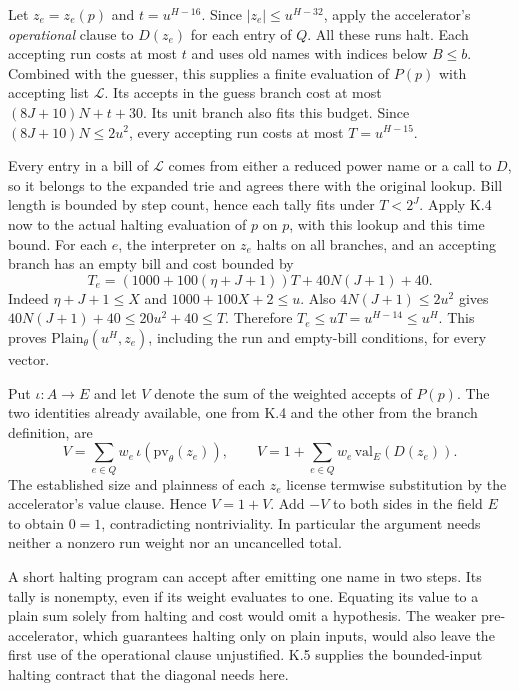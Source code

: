 \clearpage
{}
Let $z_e=z_e(p)$ and $t=u^{H-16}$. Since $|z_e|\le u^{H-32}$, apply the accelerator's \emph{operational} clause to $D(z_e)$ for each entry of $Q$. All these runs halt. Each accepting run costs at most $t$ and uses old names with indices below $B\le b$. Combined with the guesser, this supplies a finite evaluation of $P(p)$ with accepting list $\mathcal L$. Its accepts in the guess branch cost at most $(8J+10)N+t+30$. Its unit branch also fits this budget. Since $(8J+10)N\le2u^2$, every accepting run costs at most $T=u^{H-15}$.

Every entry in a bill of $\mathcal L$ comes from either a reduced power name or a call to $D$, so it belongs to the expanded trie and agrees there with the original lookup. Bill length is bounded by step count, hence each tally fits under $T<2^J$. Apply K.4 now to the actual halting evaluation of $p$ on $p$, with this lookup and this time bound. For each $e$, the interpreter on $z_e$ halts on all branches, and an accepting branch has an empty bill and cost bounded by
\[
 T_e=(1000+100(\eta+J+1))T+40N(J+1)+40.
\]
Indeed $\eta+J+1\le X$ and $1000+100X+2\le u$. Also $4N(J+1)\le2u^2$ gives $40N(J+1)+40\le20u^2+40\le T$. Therefore $T_e\le uT=u^{H-14}\le u^H$. This proves $\mathrm{Plain}_\theta(u^H,z_e)$, including the run and empty-bill conditions, for every vector.

Put $\iota:A\to E$ and let $V$ denote the sum of the weighted accepts of $P(p)$. The two identities already available, one from K.4 and the other from the branch definition, are
\[
 V=\sum_{e\in Q} w_e\,\iota(\mathrm{pv}_\theta(z_e)),\qquad
 V=1+\sum_{e\in Q} w_e\,\mathrm{val}_E(D(z_e)).
\]
The established size and plainness of each $z_e$ license termwise substitution by the accelerator's value clause. Hence $V=1+V$. Add $-V$ to both sides in the field $E$ to obtain $0=1$, contradicting nontriviality. In particular the argument needs neither a nonzero run weight nor an uncancelled total.

A short halting program can accept after emitting one name in two steps. Its tally is nonempty, even if its weight evaluates to one. Equating its value to a plain sum solely from halting and cost would omit a hypothesis. The weaker pre-accelerator, which guarantees halting only on plain inputs, would also leave the first use of the operational clause unjustified. K.5 supplies the bounded-input halting contract that the diagonal needs here.

